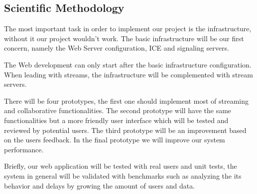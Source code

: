 
\subsection{Scientific Methodology} %

The most important task in order to implement our project is the infrastructure, without it our project wouldn't work. The basic infrastructure will be our first concern, namely the Web Server configuration, ICE and signaling servers. 

The Web development can only start after the basic infrastructure configuration. When leading with streams, the infrastructure will be complemented with stream servers.

There will be four prototypes, the first one should implement most of streaming and collaborative functionalities. The second prototype will have the same functionalities but a more friendly user interface which will be tested and reviewed by potential users. The third prototype will be an improvement based on the users feedback. In the final prototype we will improve our system performance. 

Briefly, our web application will be tested with real users and unit tests, the system in general will be validated with benchmarks such as analyzing the its behavior and delays by growing the amount of users and data.
